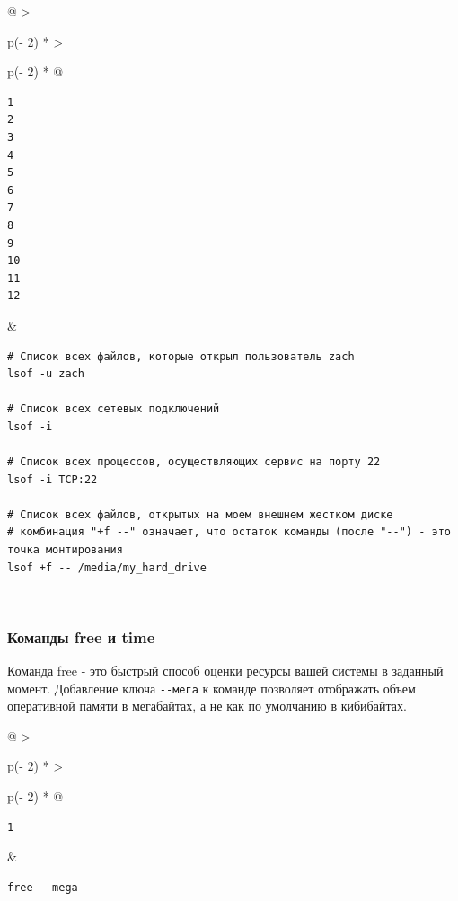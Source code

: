 \documentclass{article}
\begin{document}
\begin{longtable}[]{@{}
  >{\raggedright\arraybackslash}p{(\columnwidth - 2\tabcolsep) * }
  >{\raggedright\arraybackslash}p{(\columnwidth - 2\tabcolsep) * }@{}}
\toprule
\endhead
\begin{minipage}[t]{\linewidth}\raggedright
\begin{verbatim}
1
2
3
4
5
6
7
8
9
10
11
12
\end{verbatim}
\end{minipage} & \begin{minipage}[t]{\linewidth}\raggedright
\begin{verbatim}
# Список всех файлов, которые открыл пользователь zach
lsof -u zach

# Список всех сетевых подключений
lsof -i

# Список всех процессов, осуществляющих сервис на порту 22
lsof -i TCP:22

# Список всех файлов, открытых на моем внешнем жестком диске
# комбинация "+f --" означает, что остаток команды (после "--") - это точка монтирования
lsof +f -- /media/my_hard_drive
\end{verbatim}
\end{minipage} \\ \addlinespace
\bottomrule
\end{longtable}

\hypertarget{free-time}{%
\subsubsection{\texorpdfstring{\protect\hyperlink{free-time}{}Команды
free и time}{Команды free и time}}\label{free-time}}

Команда free - это быстрый способ оценки ресурсы вашей системы в
заданный момент. Добавление ключа \texttt{-\/-мега} к команде позволяет
отображать объем оперативной памяти в мегабайтах, а не как по умолчанию
в кибибайтах.

\begin{longtable}[]{@{}
  >{\raggedright\arraybackslash}p{(\columnwidth - 2\tabcolsep) * }
  >{\raggedright\arraybackslash}p{(\columnwidth - 2\tabcolsep) * }@{}}
\toprule
\endhead
\begin{minipage}[t]{\linewidth}\raggedright
\begin{verbatim}
1
\end{verbatim}
\end{minipage} & \begin{minipage}[t]{\linewidth}\raggedright
\begin{verbatim}
free --mega
\end{verbatim}
\end{minipage} \\ \addlinespace
\bottomrule
\end{longtable}
\end{document}
